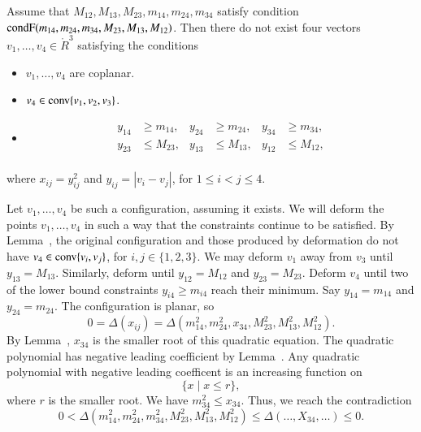 \begin{tarskidata}
\begin{tarski}

\begin{lemma} 
Assume that $M_{12},M_{13},M_{23},m_{14},m_{24},m_{34}$ satisfy
condition ${\operatorname{condF}}(m_{14},m_{24},m_{34},M_{23},M_{13},M_{12})$.
Then there do not exist four vectors
$v_1,\ldots,v_4\in\ring{R}^3$ satisfying the conditions
	\begin{itemize}
		\item $v_1,\ldots,v_4$ are coplanar.
		\item $v_4\in{\operatorname{conv}}\{v_1,v_2,v_3\}$.
		\item $$
	\begin{array}{rlrlrl}
		y_{14} &\ge m_{14}, &y_{24} &\ge m_{24}, &y_{34}&\ge m_{34},\\
		y_{23} &\le  M_{23}, &y_{13} & \le M_{13}, &y_{12}&\le M_{12},\\
	\end{array}
	$$
	\end{itemize}
where
$x_{ij}=y_{ij}^2$ and $y_{ij}=|v_i-v_j|$,
for $1\le i < j \le 4$.  
\end{lemma}



\begin{proved}
	Let $v_1,\ldots,v_4$ be such a configuration, assuming it exists.  
We will deform the points $v_1,\ldots,v_4$ in such a way that the constraints continue
to be satisfied.  By Lemma~,
the original configuration and those produced by deformation do not have
	$v_4\in{\operatorname{conv}}\{v_i,v_j\}$, for $i,j\in\{1,2,3\}$.
We may deform $v_1$ away from $v_3$ until $y_{13}=M_{13}$.  Similarly,
deform until $y_{12}=M_{12}$ and $y_{23}=M_{23}$.    Deform $v_4$ until two of the
lower bound constraints $y_{i4}\ge m_{i4}$ reach their minimum. 
Say $y_{14}=m_{14}$ and $y_{24}=m_{24}$.
The configuration is planar, so
	$$
	0=\Delta(x_{ij}) = \Delta(m_{14}^2,m_{24}^2,x_{34},M_{23}^2,M_{13}^2,M_{12}^2).
	$$
By Lemma~, $x_{34}$ is the smaller root of this quadratic equation.
The quadratic polynomial has negative leading coefficient by Lemma~.
Any quadratic polynomial with negative leading coefficent is an increasing function on
	$$\{x \mid x \le r\},$$ where $r$ is the smaller root.
We have $m_{34}^2\le x_{34}$. Thus, we reach the contradiction
	$$0<\Delta(m_{14}^2,m_{24}^2,m_{34}^2,M_{23}^2,M_{13}^2,M_{12}^2)
        \le \Delta(\ldots,X_{34},\ldots)\le 0.$$
\swallowed\end{proved}
\end{tarski}








\end{tarskidata}
